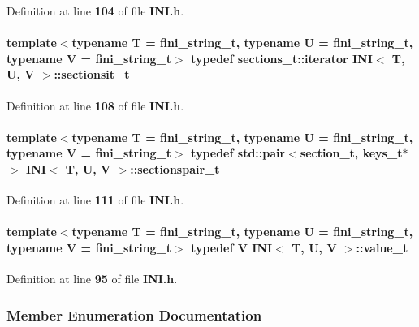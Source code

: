 Definition at line {\bf 104} of file {\bf I\+N\+I.\+h}.

\paragraph[{sectionsit\+\_\+t}]{\setlength{\rightskip}{0pt plus 5cm}template$<$typename T  = fini\+\_\+string\+\_\+t, typename U  = fini\+\_\+string\+\_\+t, typename V  = fini\+\_\+string\+\_\+t$>$ typedef sections\+\_\+t\+::iterator {\bf I\+NI}$<$ T, U, V $>$\+::{\bf sectionsit\+\_\+t}}\label{classINI_a847131e25df0c4d420599b1990a21132}


Definition at line {\bf 108} of file {\bf I\+N\+I.\+h}.

\paragraph[{sectionspair\+\_\+t}]{\setlength{\rightskip}{0pt plus 5cm}template$<$typename T  = fini\+\_\+string\+\_\+t, typename U  = fini\+\_\+string\+\_\+t, typename V  = fini\+\_\+string\+\_\+t$>$ typedef std\+::pair$<${\bf section\+\_\+t}, {\bf keys\+\_\+t}$\ast$$>$ {\bf I\+NI}$<$ T, U, V $>$\+::{\bf sectionspair\+\_\+t}}\label{classINI_a87b850df48a4bf8c792df26927dec359}


Definition at line {\bf 111} of file {\bf I\+N\+I.\+h}.

\paragraph[{value\+\_\+t}]{\setlength{\rightskip}{0pt plus 5cm}template$<$typename T  = fini\+\_\+string\+\_\+t, typename U  = fini\+\_\+string\+\_\+t, typename V  = fini\+\_\+string\+\_\+t$>$ typedef V {\bf I\+NI}$<$ T, U, V $>$\+::{\bf value\+\_\+t}}\label{classINI_aeda858880798b4d54ba09bbd00ee1683}


Definition at line {\bf 95} of file {\bf I\+N\+I.\+h}.



\subsubsection{Member Enumeration Documentation}
